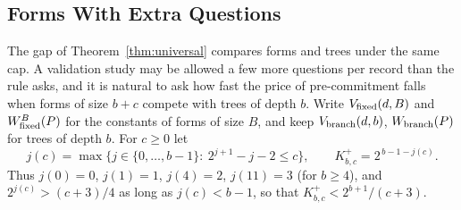 \subsection{Forms With Extra Questions}\label{app:augment}
The gap of Theorem~\ref{thm:universal} compares forms and trees under the same cap. A validation study may be allowed a few more questions per record than the rule asks, and it is natural to ask how fast the price of pre-commitment falls when forms of size $b+c$ compete with trees of depth $b$. Write $V_{\rm fixed}(d,B)$ and $W^{B}_{\rm fixed}(P)$ for the constants of forms of size $B$, and keep $V_{\rm branch}(d,b)$, $W_{\rm branch}(P)$ for trees of depth $b$. For $c\ge0$ let
\[
 j(c)=\max\{j\in\{0,\ldots,b-1\}:\ 2^{j+1}-j-2\le c\},\qquad K^{+}_{b,c}=2^{\,b-1-j(c)} .
\]
Thus $j(0)=0$, $j(1)=1$, $j(4)=2$, $j(11)=3$ (for $b\ge4$), and $2^{j(c)}>(c+3)/4$ as long as $j(c)<b-1$, so that $K^{+}_{b,c}<2^{b+1}/(c+3)$.

